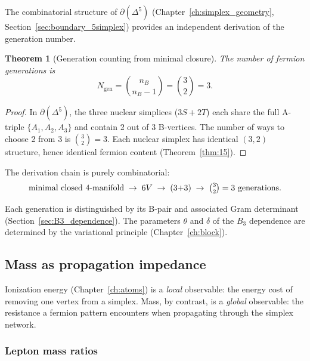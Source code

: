 \documentclass[12pt]{article}
\newtheorem{theorem}{Theorem}[section]
\theoremstyle{remark}
\theoremstyle{definition}
\begin{document}
The combinatorial structure of $\partial(\Delta^5)$ (Chapter~\ref{ch:simplex_geometry}, Section~\ref{sec:boundary_5simplex}) provides an independent derivation of the generation number.

\begin{theorem}[Generation counting from minimal closure]
\label{thm:gen_count}
The number of fermion generations is
\begin{equation}
N_\mathrm{gen} = \binom{n_B}{n_B - 1} = \binom{3}{2} = 3.
\end{equation}
\end{theorem}

\begin{proof}
In $\partial(\Delta^5)$, the three nuclear simplices ($3S + 2T$) each share the full A-triple $\{A_1, A_2, A_3\}$ and contain 2 out of 3 B-vertices. The number of ways to choose 2 from 3 is $\binom{3}{2} = 3$.  Each nuclear simplex has identical $(3,2)$ structure, hence identical fermion content (Theorem~\ref{thm:15}).
\end{proof}

The derivation chain is purely combinatorial:
\begin{equation}
\text{minimal closed $4$-manifold} \;\to\; 6V \;\to\; (3{+}3) \;\to\; \tbinom{3}{2} = 3 \text{ generations}.
\end{equation}

Each generation is distinguished by its B-pair and associated Gram determinant (Section~\ref{sec:B3_dependence}).  The parameters $\theta$ and $\delta$ of the $B_3$ dependence are determined by the variational principle (Chapter~\ref{ch:block}).

\subsection{Mass as propagation impedance}
\label{sec:mass_impedance}

Ionization energy (Chapter~\ref{ch:atoms}) is a \emph{local} observable: the energy cost of removing one vertex from a simplex.  Mass, by contrast, is a \emph{global} observable: the resistance a fermion pattern encounters when propagating through the simplex network.

\subsubsection{Lepton mass ratios}
\end{document}
